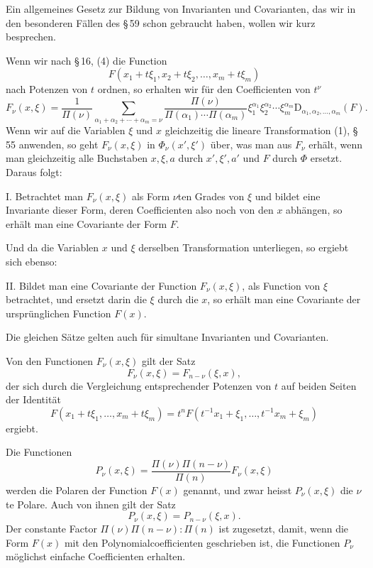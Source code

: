 \documentclass[11pt]{article}
\providecommand{\D}{\mathrm D}
\begin{document}
Ein allgemeines Gesetz zur Bildung von Invarianten und Covarianten, das wir in den besonderen Fällen des \S\,59 schon gebraucht haben, wollen wir kurz besprechen.

Wenn wir nach \S\,16, (4) die Function
\[
 F(x_1+t\xi_1,x_2+t\xi_2,
 \ldots,x_m+t\xi_m)
\]
nach Potenzen von $t$ ordnen, so erhalten wir für den Coefficienten von $t^\nu$
\begin{equation}
 F_\nu(x,\xi)=\frac1{\Pi(\nu)}
 \sum_{\alpha_1+\alpha_2+\cdots+\alpha_m=\nu}
 \frac{\Pi(\nu)}{\Pi(\alpha_1)\cdots\Pi(\alpha_m)}
 \xi_1^{\alpha_1}\xi_2^{\alpha_2}\cdots\xi_m^{\alpha_m}
 \D_{\alpha_1,\alpha_2,\ldots,\alpha_m}(F).
\tag{4}
\end{equation}
Wenn wir auf die Variablen $\xi$ und $x$ gleichzeitig die lineare Transformation (1), \S\,55 anwenden, so geht $F_\nu(x,\xi)$ in $\Phi_\nu(x',\xi')$ über, was man aus $F_\nu$ erhält, wenn man gleichzeitig alle Buchstaben $x,\xi,a$ durch $x',\xi',a'$ und $F$ durch $\Phi$ ersetzt. Daraus folgt:

I. Betrachtet man $F_\nu(x,\xi)$ als Form $\nu$ten Grades von $\xi$ und bildet eine Invariante dieser Form, deren Coefficienten also noch von den $x$ abhängen, so erhält man eine Covariante der Form $F$.

Und da die Variablen $x$ und $\xi$ derselben Transformation unterliegen, so ergiebt sich ebenso:

II. Bildet man eine Covariante der Function $F_\nu(x,\xi)$, als Function von $\xi$ betrachtet, und ersetzt darin die $\xi$ durch die $x$, so erhält man eine Covariante der ursprünglichen Function $F(x)$.

Die gleichen Sätze gelten auch für simultane Invarianten und Covarianten.

Von den Functionen $F_\nu(x,\xi)$ gilt der Satz
\begin{equation}
 F_\nu(x,\xi)=F_{n-\nu}(\xi,x),
\tag{5}
\end{equation}
der sich durch die Vergleichung entsprechender Potenzen von $t$ auf beiden Seiten der Identität
\[
 F(x_1+t\xi_1,\ldots,x_m+t\xi_m)=t^nF(t^{-1}x_1+\xi_1,\ldots,t^{-1}x_m+\xi_m)
\]
ergiebt.

Die Functionen
\[
 P_\nu(x,\xi)=\frac{\Pi(\nu)\Pi(n-\nu)}{\Pi(n)}F_\nu(x,\xi)
\]
werden die Polaren der Function $F(x)$ genannt, und zwar heisst $P_\nu(x,\xi)$ die $\nu$te Polare. Auch von ihnen gilt der Satz
\[
 P_\nu(x,\xi)=P_{n-\nu}(\xi,x).
\]
Der constante Factor $\Pi(\nu)\Pi(n-\nu):\Pi(n)$ ist zugesetzt, damit, wenn die Form $F(x)$ mit den Polynomialcoefficienten geschrieben ist, die Functionen $P_\nu$ möglichst einfache Coefficienten erhalten.
\end{document}
